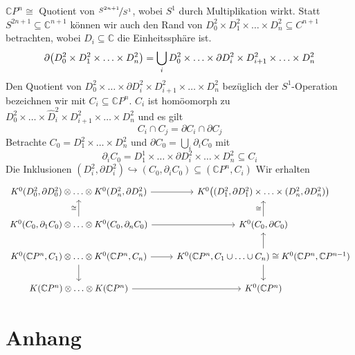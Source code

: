 $\mathds{C}P^n \cong$ Quotient von $\nicefrac{S^{2n+1}}{S^1}$, wobei $S^1$ durch Multiplikation wirkt. Statt $S^{2n+1} \subseteq \mathds{C}^{n+1}$ können wir auch den Rand
von $D_0^2 \times D_1^2 \times \ldots \times D_n^2 \subseteq C^{n+1}$ betrachten, wobei $D_i \subseteq \mathds{C}$ die Einheitssphäre ist.
\[
	\partial \enbrace*{D_0^2 \times D_1^2 \times \ldots \times D_n^2} = \bigcup_i D_0^2 \times \ldots \times \partial D_i^2 \times D_{i+1}^2 \times \ldots \times D_n^2 
\]
Den Quotient von $D_0^2 \times \ldots \times \partial D_i^2 \times D_{i+1}^2 \times \ldots \times D_n^2 $ bezüglich der $S^1$-Operation bezeichnen wir mit 
$C_i \subseteq \mathds{C}P^n$. $C_i$ ist homöomorph zu $D_0^2 \times \ldots \times \hat{D}_i^2 \times D_{i+1}^2 \times \ldots \times D_n^2 $ und es gilt
\[
	C_i \cap C_j = \partial C_i \cap \partial C_j
\]
Betrachte $C_0 = D_1^2 \times \ldots \times D_n^2$ und $\partial C_0 = \bigcup_i \partial_i C_0$ mit 
\[
	\partial_i C_0 = D_1^1 \times \ldots \times \partial D_i^2 \times \ldots \times D_n^2 \subseteq C_i
\]
Die Inklusionen $(D_i^2,\partial D_i^2) \hookrightarrow (C_0,\partial_i C_0) \subseteq (\mathds{C}P^n,C_i)$ Wir erhalten 
\[
	\begin{tikzcd}
			K^0(D^2_0,\partial D_0^2) \otimes  \ldots \otimes K^0(D_n^2,\partial D_n^2) \rar 
			& K^0 \enbrace*{ (D_1^2,\partial D_1^2) \times \ldots \times (D_n^2, \partial D_n^2)} \\
			K^0(C_0,\partial_1 C_0) \otimes \ldots \otimes K^0(C_0,\partial_n C_0) \rar \uar["\cong"] & K^0(C_0,\partial C_0) \uar["\cong"] \\
			K^0(\mathds{C}P^n,C_1) \otimes \ldots \otimes K^0(\mathds{C}P^n,C_n) \rar \dar & K^0(\mathds{C}P^n, C_1 \cup \ldots \cup C_n) \cong 
			K^0(\mathds{C}P^n,\mathds{C}P^{n-1}) \dar \uar\\
			K(\mathds{C}P^n) \otimes \ldots \otimes K(\mathds{C}P^n) \rar & K^0(\mathds{C}P^n)
	\end{tikzcd}
\]


\cleardoubleoddemptypage
\appendix
\section{Anhang}

